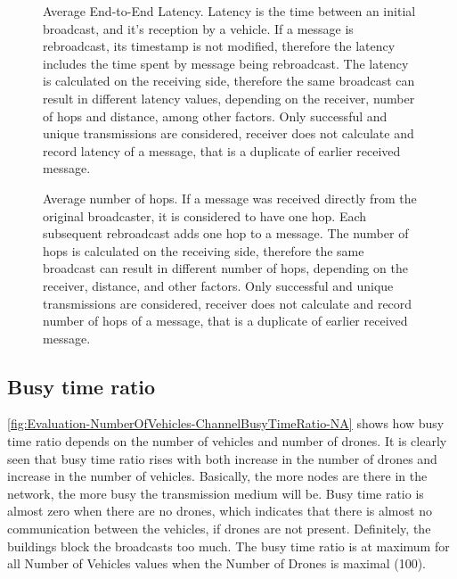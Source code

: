 \documentclass[]{nsm-thesis}
\begin{document}
\begin{figure}%
	\centering
	\hfill
	\hfill
	\caption{Average End-to-End Latency. Latency is the time between an initial broadcast, and it's reception by a vehicle. If a message is rebroadcast, its timestamp is not modified, therefore the latency includes the time spent by message being rebroadcast. The latency is calculated on the receiving side, therefore the same broadcast can result in different latency values, depending on the receiver, number of hops and distance, among other factors. Only successful and unique transmissions are considered, receiver does not calculate and record latency of a message, that is a duplicate of earlier received message.}%
	\label{fig:Evaluation-Latency}%
\end{figure}

\begin{figure}%
	\centering
	\hfill
	\hfill
	\caption{Average number of hops. If a message was received directly from the original broadcaster, it is considered to have one hop. Each subsequent rebroadcast adds one hop to a message. The number of hops is calculated on the receiving side, therefore the same broadcast can result in different number of hops, depending on the receiver, distance, and other factors. Only successful and unique transmissions are considered, receiver does not calculate and record number of hops of a message, that is a duplicate of earlier received message.}%
	\label{fig:Evaluation-Latency}%
\end{figure}

\subsection{Busy time ratio}

\cref{fig:Evaluation-NumberOfVehicles-ChannelBusyTimeRatio-NA} shows how busy time ratio depends on the number of vehicles and number of drones. It is clearly seen that busy time ratio rises with both increase in the number of drones and increase in the number of vehicles. Basically, the more nodes are there in the network, the more busy the transmission medium will be. Busy time ratio is almost zero when there are no drones, which indicates that there is almost no communication between the vehicles, if drones are not present. Definitely, the buildings block the broadcasts too much. The busy time ratio is at maximum for all Number of Vehicles values when the Number of Drones is maximal (100).
\end{document}
